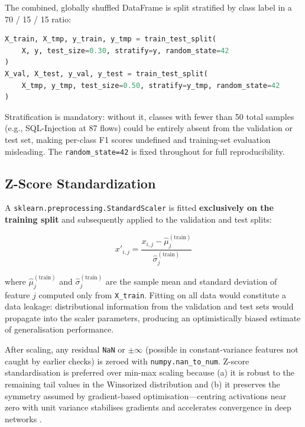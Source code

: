 \documentclass[12pt]{article}
\theoremstyle{plain}
\begin{document}
The combined, globally shuffled DataFrame is split stratified by class label in a 70 / 15 / 15 ratio:

\begin{lstlisting}[language=Python, caption={Stratified two-stage split for 70/15/15 partitioning.}]
X_train, X_tmp, y_train, y_tmp = train_test_split(
    X, y, test_size=0.30, stratify=y, random_state=42
)
X_val, X_test, y_val, y_test = train_test_split(
    X_tmp, y_tmp, test_size=0.50, stratify=y_tmp, random_state=42
)
\end{lstlisting}

Stratification is mandatory: without it, classes with fewer than 50 total samples (e.g., SQL-Injection at 87 flows) could be entirely absent from the validation or test set, making per-class F1 scores undefined and training-set evaluation misleading. The \texttt{random\_state=42} is fixed throughout for full reproducibility.

\subsection{Z-Score Standardization}

A \texttt{sklearn.preprocessing.StandardScaler} is fitted \textbf{exclusively on the training split} and subsequently applied to the validation and test splits:

\begin{equation}
x'_{i,j} = \frac{x_{i,j} - \hat{\mu}_j^{(\text{train})}}{\hat{\sigma}_j^{(\text{train})}}
\end{equation}

where $\hat{\mu}_j^{(\text{train})}$ and $\hat{\sigma}_j^{(\text{train})}$ are the sample mean and standard deviation of feature $j$ computed only from \texttt{X\_train}. Fitting on all data would constitute a data leakage: distributional information from the validation and test sets would propagate into the scaler parameters, producing an optimistically biased estimate of generalisation performance.

After scaling, any residual \texttt{NaN} or $\pm\infty$ (possible in constant-variance features not caught by earlier checks) is zeroed with \texttt{numpy.nan\_to\_num}. Z-score standardisation is preferred over min-max scaling because (a) it is robust to the remaining tail values in the Winsorized distribution and (b) it preserves the symmetry assumed by gradient-based optimisation—centring activations near zero with unit variance stabilises gradients and accelerates convergence in deep networks \cite{LeCun1998}.
\end{document}
